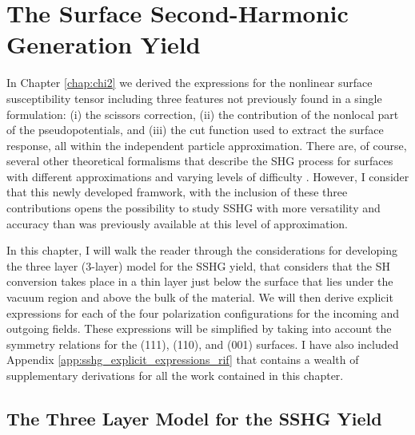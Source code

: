 \chapter{The Surface Second-Harmonic Generation Yield}\label{chap:sshgyield}
\partialtoc

In Chapter \ref{chap:chi2} we derived the expressions for the nonlinear surface
susceptibility tensor including three features not previously found in a single
formulation: (i) the scissors correction, (ii) the contribution of the nonlocal
part of the pseudopotentials, and (iii) the cut function used to extract the
surface response, all within the independent particle approximation. There are,
of course, several other theoretical formalisms that describe the SHG process
for surfaces with different approximations and varying levels of difficulty
\cite{levinePRB94, mendozaPRL98, arzatePRB01, mendozaPRB01, mejiaPRB02,
sanoPRB02, mejiaRMF04, trollePRB14}. However, I consider that this newly
developed framwork, with the inclusion of these three contributions opens the
possibility to study SSHG with more versatility and accuracy than was previously
available at this level of approximation.

In this chapter, I will walk the reader through the considerations for
developing the three layer (3-layer) model for the SSHG yield, that considers
that the SH conversion takes place in a thin layer just below the surface that
lies under the vacuum region and above the bulk of the material. We will then
derive explicit expressions for each of the four polarization configurations for
the incoming and outgoing fields. These expressions will be simplified by taking
into account the symmetry relations for the (111), (110), and (001) surfaces. I
have also included Appendix \ref{app:sshg_explicit_expressions_rif} that
contains a wealth of supplementary derivations for all the work contained in
this chapter.



\section{The Three Layer Model for the SSHG Yield}\label{sec:3layersshg}

